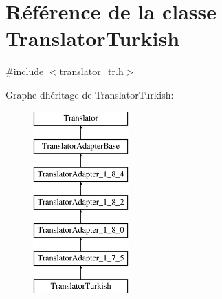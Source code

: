 \hypertarget{class_translator_turkish}{}\section{Référence de la classe Translator\+Turkish}
\label{class_translator_turkish}


{\ttfamily \#include $<$translator\+\_\+tr.\+h$>$}

Graphe d\textquotesingle{}héritage de Translator\+Turkish\+:\begin{figure}[H]
\begin{center}
\leavevmode
\includegraphics[height=7.000000cm]{class_translator_turkish}
\end{center}
\end{figure}
